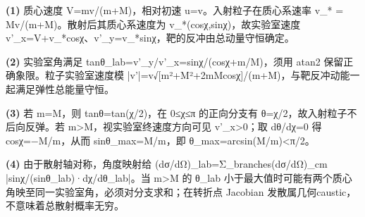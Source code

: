 \par\noindent\textbf{(1)} 质心速度 V=mv/(m+M)，相对初速 u=v。入射粒子在质心系速率 v\_* = Mv/(m+M)。散射后其质心系速度为 v\_*(cosχ,sinχ)，故实验室速度 v'\_x=V+v\_*cosχ、v'\_y=v\_*sinχ，靶的反冲由总动量守恒确定。
\par\noindent\textbf{(2)} 实验室角满足 tanθ\_lab=v'\_y/v'\_x=sinχ/(cosχ+m/M)，须用 atan2 保留正确象限。粒子实验室速度模 |v'|=v√[m²+M²+2mMcosχ]/(m+M)，与靶反冲动能一起满足弹性总能量守恒。
\par\noindent\textbf{(3)} 若 m=M，则 tanθ=tan(χ/2)，在 0≤χ≤π 的正向分支有 θ=χ/2，故入射粒子不后向反弹。若 m>M，视实验室终速度方向可见 v'\_x>0；取 dθ/dχ=0 得 cosχ=−M/m，从而 sinθ\_max=M/m，即 θ\_max=arcsin(M/m)<π/2。
\par\noindent\textbf{(4)} 由于散射轴对称，角度映射给 (dσ/dΩ)\_lab=Σ\_branches(dσ/dΩ)\_cm |sinχ/(sinθ\_lab)·dχ/dθ\_lab|。当 m>M 的 θ\_lab 小于最大值时可能有两个质心角映至同一实验室角，必须对分支求和；在转折点 Jacobian 发散属几何caustic，不意味着总散射概率无穷。
